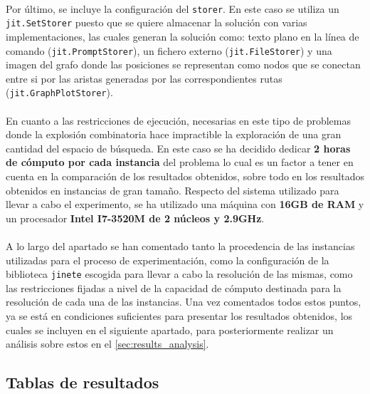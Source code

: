 \documentclass{subfiles}
\begin{document}
        \paragraph{}
        Por último, se incluye la configuración del \texttt{storer}. En este caso se utiliza un \texttt{jit.SetStorer} puesto que se quiere almacenar la solución con varias implementaciones, las cuales generan la solución como: texto plano en la línea de comando (\texttt{jit.PromptStorer}), un fichero externo (\texttt{jit.FileStorer}) y una imagen del grafo donde las posiciones se representan como nodos que se conectan entre si por las aristas generadas por las correspondientes rutas (\texttt{jit.GraphPlotStorer}).

        \paragraph{}
        En cuanto a las restricciones de ejecución, necesarias en este tipo de problemas donde la explosión combinatoria hace impractible la exploración de una gran cantidad del espacio de búsqueda. En este caso se ha decidido dedicar \textbf{2 horas de cómputo por cada instancia} del problema lo cual es un factor a tener en cuenta en la comparación de los resultados obtenidos, sobre todo en los resultados obtenidos en instancias de gran tamaño. Respecto del sistema utilizado para llevar a cabo el experimento, se ha utilizado una máquina con \textbf{16GB de RAM} y un procesador \textbf{Intel I7-3520M de 2 núcleos y 2.9GHz}.

        \paragraph{}
        A lo largo del apartado se han comentado tanto la procedencia de las instancias utilizadas para el proceso de experimentación, como la configuración de la biblioteca \texttt{jinete} escogida para llevar a cabo la resolución de las mismas, como las restricciones fijadas a nivel de la capacidad de cómputo destinada para la resolución  de cada una de las instancias. Una vez comentados todos estos puntos, ya se está en condiciones suficientes para presentar los resultados obtenidos, los cuales se incluyen en el siguiente apartado, para posteriormente realizar un análisis sobre estos en el \cref{sec:results_analysis}.

      \subsection{Tablas de resultados}
      \label{sec:results_tables}
\end{document}
